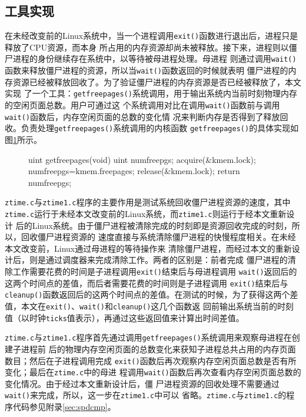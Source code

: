 \documentclass{swfuthesism}
\begin{document}
\subsection{工具实现}

在未经改变前的Linux系统中，当一个进程调用\texttt{exit()}函数进行退出后，进程只是释放了CPU资源，而本身
 所占用的内存资源却尚未被释放。接下来，进程则以僵尸进程的身份继续存在系统中，以等待被母进程处理。母进程
 则通过调用\texttt{wait()}函数来释放僵尸进程的资源，所以当\texttt{wait()}函数返回的时候就表明
 僵尸进程的内存资源已经被释放回收了。为了验证僵尸进程的内存资源是否已经被释放了，本文实现
 了一个工具：\texttt{getfreepages()}系统调用，用于输出系统内当前时刻物理内存的空闲页面总数。用户可通过这
 个系统调用对比在调用\texttt{wait()}函数前与调用\texttt{wait()}函数后，内存空闲页面的总数的变化情
 况来判断内存是否得到了释放回收。负责处理\texttt{getfreepages()}系统调用的内核函数
 \texttt{getfreepages()}的具体实现如图\ref{fig:lst:freepagescode}所示。

 \begin{figure}[H]
  \begin{codeblock}
\begin{ccode}
uint getfreepages(void)
{
  uint numfreepgs;
  acquire(&kmem.lock);
  numfreepgs=kmem.freepages;
  release(&kmem.lock);
  return numfreepgs;
}
\end{ccode}
  \end{codeblock}
  \label{fig:lst:freepagescode}
\end{figure}

\texttt{ztime.c}与\texttt{ztime1.c}程序的主要作用是测试系统回收僵尸进程资源的速度，其中
\texttt{ztime.c}运行于未经本文改变前的Linux系统，而\texttt{ztime1.c}则运行于经本文重新设计
后的Linux系统。由于僵尸进程被清除完成的时刻即是资源回收完成的时刻，所以，回收僵尸进程资源的
速度直接与系统清除僵尸进程的快慢程度相关。在未经本文改变前，Linux通过母进程的等待操作来
清除僵尸进程，而经过本文的重新设计后，则是通过调度器来完成清除工作。两者的区别是：前者完成
僵尸进程的清除工作需要花费的时间是子进程调用\texttt{exit()}结束后与母进程调用
\texttt{wait()}返回后的这两个时间点的差值，而后者需要花费的时间则是子进程调用
\texttt{exit()}结束后与\texttt{cleanup()}函数返回后的这两个时间点的差值。在测试的时候，为了获得这两个差
值，本文在\texttt{exit()}、\texttt{wait()}和\texttt{cleanup()}这几个函数返 
回前输出系统当前的时刻值（以时钟\texttt{ticks}值表示），再通过这些返回值来计算出时间差值。

\texttt{ztime.c}与\texttt{ztime1.c}程序首先通过调用\texttt{getfreepages()}系统调用来观察母进程在创建子进程前
后的物理内存空闲页面的总数变化来获知子进程总共占用的内存页面数目；然后在子进程调用完成
\texttt{exit()}函数后再次观察内存空闲页面总数是否有所变化；最后在\texttt{ztime.c}中的母进
程调用\texttt{wait()}函数后再次查看内存空闲页面总数的变化情况。由于经过本文重新设计后，僵
尸进程资源的回收处理不需要通过\texttt{wait()}来完成，所以，这一步在\texttt{ztime1.c}中可以
省略。\texttt{ztime.c}与\texttt{ztime1.c}的程序代码参见附录\ref{sec:spdcmp}。
\end{document}
